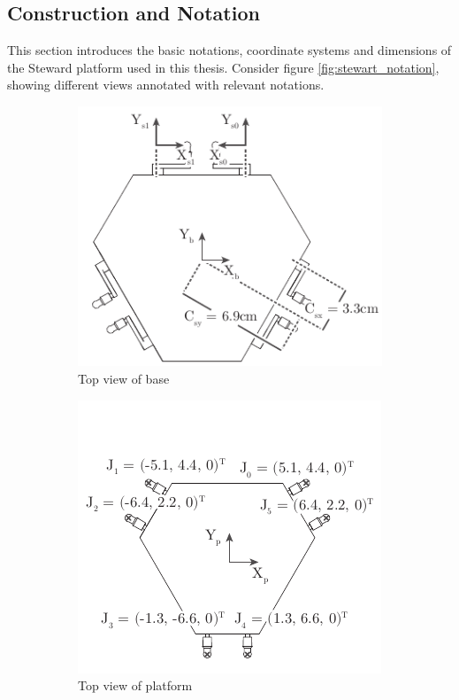 \subsection{Construction and Notation}
This section introduces the basic notations, coordinate systems and dimensions
of the Steward platform used in this thesis. Consider figure
\ref{fig:stewart_notation}, showing different views annotated with relevant
notations.
\begin{figure}
	\centering
	\begin{subfigure}{0.49\textwidth}
		\centering
		\includegraphics{../figures/stewart_base}
		\caption{Top view of base}
		\label{fig:stewart_base}
	\end{subfigure}
	\begin{subfigure}{0.49\textwidth}
		\centering
		\includegraphics{../figures/stewart_platform}
		\caption{Top view of platform}
		\label{fig:stewart_platform}
	\end{subfigure}
	\par\bigskip
	\begin{subfigure}{0.49\textwidth}

\end{subfigure}
\end{figure}
